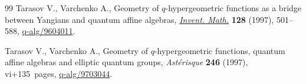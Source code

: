 \documentclass[pdftex]{sigma}
\numberwithin{equation}{section}
\begin{document}
\begin{thebibliography}{99}
Tarasov V., Varchenko A., Geometry of {$q$}-hypergeometric functions as a
 bridge between {Y}angians and quantum affine algebras, \href{https://doi.org/10.1007/s002220050151}{\textit{Invent. Math.}}
 \textbf{128} (1997), 501--588, \href{https://arxiv.org/abs/q-alg/9604011}{q-alg/9604011}.

Tarasov V., Varchenko A., Geometry of {$q$}-hypergeometric functions, quantum
 affine algebras and elliptic quantum groups, \textit{Ast\'{e}risque}
 \textbf{246} (1997), vi+135~pages, \href{https://arxiv.org/abs/q-alg/9703044}{q-alg/9703044}.

\end{thebibliography}\LastPageEnding
\end{document}
